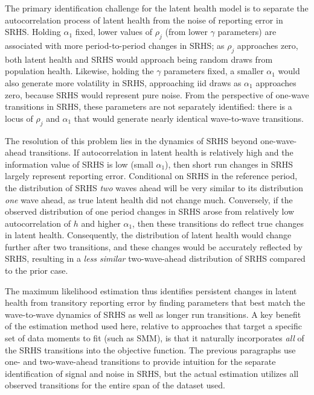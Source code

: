 \documentclass[12pt,pdftex,letterpaper]{article}
\newcommand{\Health}{h}
\newcommand{\Age}{j}
\newcommand{\Corr}{\rho}
\newcommand{\CorrParam}{\gamma}
\newcommand{\LatentParam}{\alpha}
\begin{document}
The primary identification challenge for the latent health model is to separate the autocorrelation process of latent health from the noise of reporting error in SRHS.  Holding $\LatentParam_1$ fixed, lower values of $\Corr_\Age$ (from lower $\CorrParam$ parameters) are associated with more period-to-period changes in SRHS; as $\Corr_\Age$ approaches zero, both latent health and SRHS would approach being random draws from population health.  Likewise, holding the $\CorrParam$ parameters fixed, a smaller $\LatentParam_1$ would also generate more volatility in SRHS, approaching iid draws as $\LatentParam_1$ approaches zero, because SRHS would represent pure noise.  From the perspective of one-wave transitions in SRHS, these parameters are not separately identified: there is a locus of $\Corr_\Age$ and $\LatentParam_1$ that would generate nearly identical wave-to-wave transitions.

The resolution of this problem lies in the dynamics of SRHS beyond one-wave-ahead transitions.  If autocorrelation in latent health is relatively high and the information value of SRHS is low (small $\LatentParam_1$), then short run changes in SRHS largely represent reporting error.  Conditional on SRHS in the reference period, the distribution of SRHS \textit{two} waves ahead will be very similar to its distribution \textit{one} wave ahead, as true latent health did not change much.  Conversely, if the observed distribution of one period changes in SRHS arose from relatively low autocorrelation of $\Health$ and higher $\LatentParam_1$, then these transitions do reflect true changes in latent health.  Consequently, the distribution of latent health would change further after two transitions, and these changes would be accurately reflected by SRHS, resulting in a \textit{less similar} two-wave-ahead distribution of SRHS compared to the prior case.

The maximum likelihood estimation thus identifies persistent changes in latent health from transitory reporting error by finding parameters that best match the wave-to-wave dynamics of SRHS as well as longer run transitions.  A key benefit of the estimation method used here, relative to approaches that target a specific set of data moments to fit (such as SMM), is that it naturally incorporates \textit{all} of the SRHS transitions into the objective function. The previous paragraphs use one- and two-wave-ahead transitions to provide intuition for the separate identification of signal and noise in SRHS, but the actual estimation utilizes all observed transitions for the entire span of the dataset used.
\end{document}

